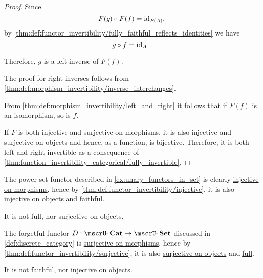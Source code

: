 \begin{proof}
  Since
  \begin{equation*}
    F(g) \bincirc F(f) = \id_{F(A)},
  \end{equation*}
  by \cref{thm:def:functor_invertibility/fully_faithful_reflects_identities} we have
  \begin{equation*}
    g \bincirc f = \id_A.
  \end{equation*}

  Therefore, \( g \) is a left inverse of \( F(f) \).

  The proof for right inverses follows from \cref{thm:def:morphism_invertibility/inverse_interchanges}.

  From \cref{thm:def:morphism_invertibility/left_and_right} it follows that if \( F(f) \) is an isomorphism, so is \( f \).

   If \( F \) is both injective and surjective on morphisms, it is also injective and surjective on objects and hence, as a function, is bijective. Therefore, it is both left and right invertible as a consequence of \cref{thm:function_invertibility_categorical/fully_invertible}.
\end{proof}

\begin{example}\label{ex:def:functor_invertibility}
  \hfill
  \begin{thmenum}
     The power set functor described in \cref{ex:unary_functors_in_set} is clearly \hyperref[def:functor_invertibility/injective_on_morphisms]{injective on morphisms}, hence by \cref{thm:def:functor_invertibility/injective}, it is also \hyperref[def:functor_invertibility/injective_on_objects]{injective on objects} and \hyperref[def:functor_invertibility/faithful]{faithful}.

    It is not full, nor surjective on objects.

     The forgetful functor \( D: \ucat{Cat} \to \ucat{Set} \) discussed in \cref{def:discrete_category} is \hyperref[def:functor_invertibility/surjective_on_morphisms]{surjective on morphisms}, hence by \cref{thm:def:functor_invertibility/surjective}, it is also \hyperref[def:functor_invertibility/surjective_on_objects]{surjective on objects} and \hyperref[def:functor_invertibility/full]{full}.

    It is not faithful, nor injective on objects.
  \end{thmenum}
\end{example}

